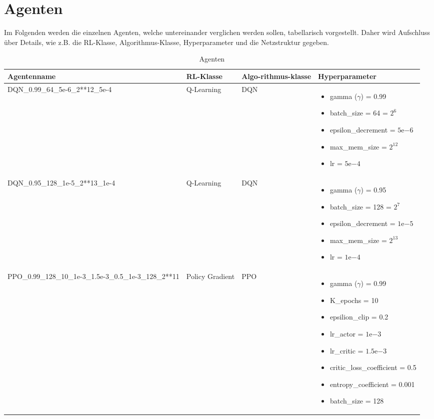 \section{Agenten}
Im Folgenden werden die einzelnen Agenten, welche untereinander verglichen werden sollen, tabellarisch vorgestellt. Daher wird Aufschluss über Details, wie z.B. die RL-Klasse, Algorithmus-Klasse, Hyperparameter und die Netzstruktur gegeben.
\begin{longtable}[h]{|p{3.5cm}|p{2.5cm}|p{1.5cm}|p{6cm}|}
	\caption{Agenten}
	\label{tab:Agenten} 
	\endfirsthead
	\endhead
	\hline
	Agentenname & RL-Klasse & Algo-rithmus-klasse & Hyperparameter \\
	\hline
	DQN\_0.99\_64\_5e-6\_2**12\_5e-4 & Q-Learning & DQN & 
	\begin{itemize}
		\item gamma ($\gamma$) = 0.99
		\item batch\_size = 64 = $2^{6}$
		\item epsilon\_decrement = $5\mathrm{e}{-6}$
		\item max\_mem\_size = $2^{12}$
		\item lr = $5\mathrm{e}{-4}$
	\end{itemize} 
	\\
	\hline
	DQN\_0.95\_128\_1e-5\_2**13\_1e-4 & Q-Learning & DQN & 
	\begin{itemize}
		\item gamma ($\gamma$) = 0.95
		\item batch\_size = 128 = $2^{7}$
		\item epsilon\_decrement = $1\mathrm{e}{-5}$
		\item max\_mem\_size = $2^{13}$
		\item lr = $1\mathrm{e}{-4}$
	\end{itemize} 
	\\
	\hline
	PPO\_0.99\_128\_10\_1e-3\_1.5e-3\_0.5\_1e-3\_128\_2**11 & Policy Gradient & PPO & 
	\begin{itemize}
		\item gamma ($\gamma$) = 0.99
		\item K\_epochs = 10
		\item epsilion\_clip = 0.2
		\item lr\_actor = $1\mathrm{e}{-3}$
		\item lr\_critic = $1.5\mathrm{e}{-3}$
		\item critic\_loss\_coefficient = 0.5
		\item entropy\_coefficient = 0.001
		\item batch\_size = 128

\end{itemize}
\end{longtable}
